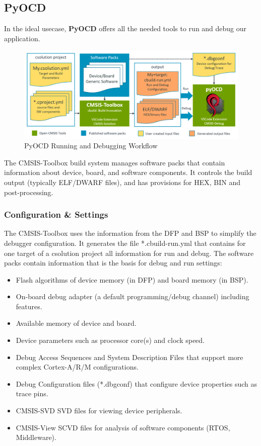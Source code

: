 \subsection{PyOCD}
In the ideal usecase, \textbf{PyOCD} offers all the needed tools to run and debug our application.
\begin{figure}[H]
    \centering
    \includegraphics[width=15cm]{img/ST_Summer_Internship/cbuild-run.png}
    \caption{PyOCD Running and Debugging Workflow}
    \label{fig:debug_wf}
\end{figure}
The CMSIS-Toolbox build system manages software packs that contain information about device, board, and software components. It controls the build output (typically ELF/DWARF files), and has provisions for HEX, BIN and post-processing.
\subsubsection*{Configuration \& Settings}
The CMSIS-Toolbox uses the information from the DFP and BSP to simplify the debugger configuration. It generates the file *.cbuild-run.yml that contains for one target of a csolution project all information for run and debug.
The software packs contain information that is the basis for debug and run settings:
\begin{itemize}
    \item Flash algorithms of device memory (in DFP) and board memory (in BSP).
    \item On-board debug adapter (a default programming/debug channel) including features.
    \item Available memory of device and board.
    \item Device parameters such as processor core(s) and clock speed.
    \item Debug Access Sequences and System Description Files that support more complex Cortex-A/R/M configurations.
    \item Debug Configuration files (*.dbgconf) that configure device properties such as trace pins.
    \item CMSIS-SVD SVD files for viewing device peripherals.
    \item CMSIS-View SCVD files for analysis of software components (RTOS, Middleware).
\end{itemize}
